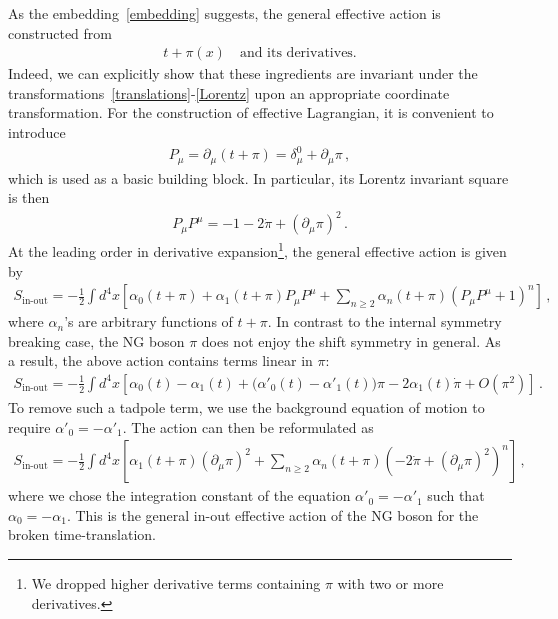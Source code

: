 \documentclass[a4paper,11pt]{article}
\begin{document}
\medskip
As the embedding~\eqref{embedding} suggests, 
the general effective action is constructed from~\cite{Cheung:2007st}
\begin{align}
 t + \pi(x)
\quad
\text{and its derivatives.}
\end{align}
Indeed, we can explicitly show that these ingredients are invariant 
under the transformations~\eqref{translations}-\eqref{Lorentz} upon 
an appropriate coordinate transformation. 
For the construction of effective Lagrangian, it is convenient to introduce
\begin{align}
P_\mu=\partial_\mu(t+\pi)=\delta^0_\mu+\partial_\mu\pi\,,
\label{notation:P}
\end{align}
which is used as a basic building block.
In particular, its Lorentz invariant square is then
\begin{align}
 P_\mu P^\mu=-1-2\dot{\pi}+(\partial_\mu\pi)^2\,.
\end{align}
At the leading order in derivative expansion\footnote{
We dropped higher derivative terms containing $\pi$ with two or 
more derivatives.},
the general effective action is given by~\cite{Cheung:2007st}
\begin{align}
\label{S_in-out_P}
 S_{\text{in-out}} 
 = -\frac{1}{2}\int d^4x 
 \left[ \alpha_0(t+\pi) + \alpha_1(t+\pi) P_\mu P^\mu 
 + \sum_{n\geq2}\alpha_n(t+\pi)(P_\mu P^\mu+1)^n 
\right]\,,
\end{align}
where $\alpha_n$'s are arbitrary functions of $t+\pi$. In contrast to the internal symmetry breaking case, 
the NG boson $\pi$ does not enjoy the shift symmetry in general. 
As a result, the above action contains terms linear in $\pi$:
\begin{align}
 S_{\text{in-out}} 
 = -\frac{1}{2}\int d^4x 
 \left[ \alpha_0(t) - \alpha_1(t)
 + \Big(\alpha'_0(t)-\alpha'_1(t)\Big)\pi-2\alpha_1(t)\dot{\pi} + O (\pi^2)
\right]\,.
\end{align}
To remove such a tadpole term, we use the background equation of motion to require $\alpha'_0=-\alpha'_1$. The action can then be reformulated as
\begin{align}
S_{\text{in-out}}=-\frac{1}{2}\int d^4x\left[\alpha_1(t+\pi)(\partial_\mu\pi)^2+\sum_{n\geq2}\alpha_n(t+\pi)\left(-2\dot{\pi}+(\partial_\mu\pi)^2\right)^n
\right]\,,\label{action:pi:inout}
\end{align}
where we chose the integration constant of the equation $\alpha'_0=-\alpha'_1$ 
such that $\alpha_0=-\alpha_1$. This is the general in-out effective action 
of the NG boson for the broken time-translation.
\end{document}
